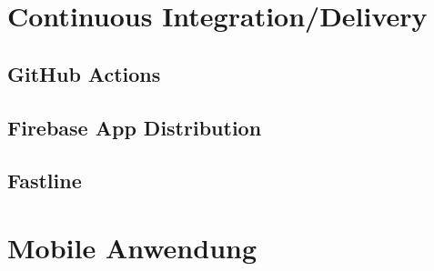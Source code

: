 \section{Continuous Integration/Delivery}
\subsection{GitHub Actions}
\subsection{Firebase App Distribution}
\subsection{Fastline}

\section{Mobile Anwendung}


